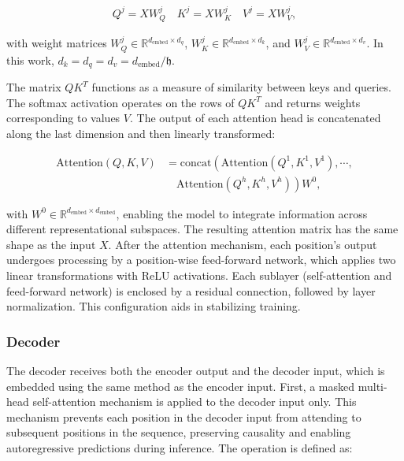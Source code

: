 \documentclass[12pt]{iopart}
\begin{document}
\begin{align}
    Q^j = X W_Q^j \quad K^j = X W_K^j \quad V^j = X W_V^j,
\end{align}

with weight matrices \(W_Q^j \in \mathbb{R}^{d_{\text{embed}} \times d_q}\), \(W_K^j \in \mathbb{R}^{d_{\text{embed}} \times d_k}\), and \(W_V^j \in \mathbb{R}^{d_{\text{embed}} \times d_v}\). In this work, \(d_k = d_q = d_v = d_{\text{embed}} / \mathfrak{h}\).

The matrix \(Q K^T\) functions as a measure of similarity between keys and queries. The softmax activation operates on the rows of \(Q K^T\) and returns weights corresponding to values \(V\). The output of each attention head is concatenated along the last dimension and then linearly transformed:

\begin{equation}
\begin{aligned}
\text{Attention}(Q, K, V) &= \text{concat}\left(\text{Attention}(Q^1, K^1, V^1), \cdots, \right. \\
&\quad \left. \text{Attention}(Q^h, K^h, V^h)\right) W^0,
\end{aligned}
\end{equation}

with \(W^0 \in \mathbb{R}^{d_{\text{embed}} \times d_{\text{embed}}}\), enabling the model to integrate information across different representational subspaces. The resulting attention matrix has the same shape as the input \(X\). After the attention mechanism, each position's output undergoes processing by a position-wise feed-forward network, which applies two linear transformations with ReLU activations. Each sublayer (self-attention and feed-forward network) is enclosed by a residual connection, followed by layer normalization. This configuration aids in stabilizing training.

\subsubsection{Decoder}
\label{sec:decoder}

The decoder receives both the encoder output and the decoder input, which is embedded using the same method as the encoder input. First, a masked multi-head self-attention mechanism is applied to the decoder input only. This mechanism prevents each position in the decoder input from attending to subsequent positions in the sequence, preserving causality and enabling autoregressive predictions during inference. The operation is defined as:
\end{document}
